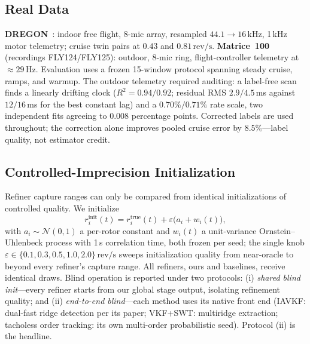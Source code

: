 \documentclass[journal]{IEEEtran}
\newcommand{\revps}{\ensuremath{\,\mathrm{rev/s}}}
\begin{document}
\subsection{Real Data}
\textbf{DREGON}~\cite{strauss2018dregon}: indoor free flight, 8-mic
array, resampled $44.1 \to 16$\,kHz, 1\,kHz motor telemetry; cruise twin
pairs at $0.43$ and $0.81\revps$. \textbf{Matrice~100} (recordings
FLY124/FLY125): outdoor, 8-mic ring, flight-controller telemetry at
${\approx}29$\,Hz. Evaluation uses a frozen 15-window protocol spanning
steady cruise, ramps, and warmup. The outdoor telemetry required
auditing: a label-free scan finds a linearly drifting clock ($R^2 =
0.94/0.92$; residual RMS $2.9/4.5$\,ms against $12/16$\,ms for the best
constant lag) and a $0.70\%/0.71\%$ rate scale, two independent fits
agreeing to $0.008$ percentage points. Corrected labels are used
throughout; the correction alone improves pooled cruise error by
$8.5\%$---label quality, not estimator credit.

\subsection{Controlled-Imprecision Initialization}
\label{sec:initproto}
Refiner capture ranges can only be compared from identical
initializations of controlled quality. We initialize
\begin{equation}
  r^{\mathrm{init}}_i(t) = r^{\mathrm{true}}_i(t) +
  \varepsilon \big( a_i + w_i(t) \big),
  \label{eq:initproto}
\end{equation}
with $a_i \sim \mathcal{N}(0,1)$ a per-rotor constant and $w_i(t)$ a
unit-variance Ornstein--Uhlenbeck process with 1\,s correlation time,
both frozen per seed; the single knob $\varepsilon \in \{0.1, 0.3, 0.5,
1.0, 2.0\}\revps$ sweeps initialization quality from near-oracle to
beyond every refiner's capture range. All refiners, ours and baselines,
receive identical draws. Blind operation is reported under two
protocols: (i) \emph{shared blind init}---every refiner starts from our
global stage output, isolating refinement quality; and (ii)
\emph{end-to-end blind}---each method uses its native front end (IAVKF:
dual-fast ridge detection per its paper; VKF+SWT: multiridge extraction;
tacholess order tracking: its own multi-order probabilistic seed).
Protocol (ii) is the headline.
\end{document}
